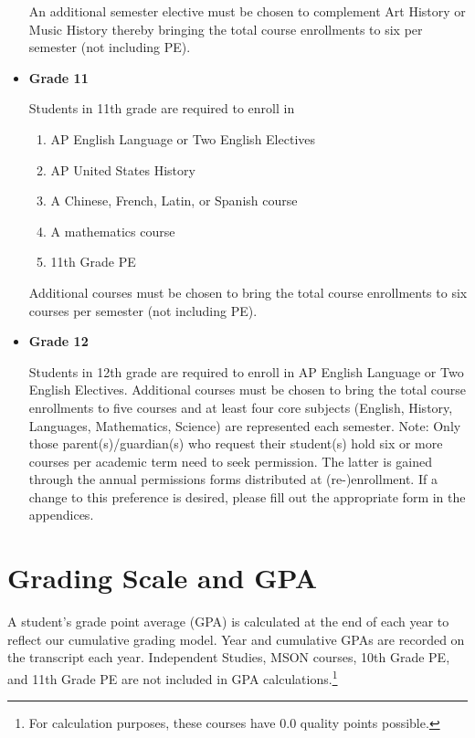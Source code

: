 \begin{itemize}
  An additional semester elective must be chosen to complement Art History or Music History thereby bringing the total course enrollments to six per semester (not including PE).
  
  \item[] \textbf{Grade 11}
  
  Students in 11th grade are required to enroll in 
\begin{enumerate}\itemsep=0mm
    \item AP English Language or Two English Electives
    \item AP United States History
    \item A Chinese, French, Latin, or Spanish course 
    \item A mathematics course
    \item 11th Grade PE
  \end{enumerate}
  
  Additional courses must be chosen to bring the total course enrollments to six courses per semester (not including PE).
  
  \item[] \textbf{Grade 12    }
  
  Students in 12th grade are required to enroll in AP English Language or Two English Electives.  Additional courses must be chosen to bring the total course enrollments to five courses and at least four core subjects (English, History, Languages, Mathematics, Science) are represented each semester.  Note:  Only those parent(s)/guardian(s) who request their student(s)  hold six or more courses per academic term need to seek permission.  The latter is gained through the annual permissions forms distributed at (re-)enrollment.  If a change to this preference is desired, please fill out the appropriate form in the appendices.

\end{itemize}

\section{Grading Scale and GPA}

A student's grade point average (GPA) is calculated at the end of each year to reflect our cumulative grading model. Year and cumulative GPAs are recorded on the transcript each year.  Independent Studies, MSON courses, 10th Grade PE, and 11th Grade PE are not included in GPA calculations.\footnote{For calculation purposes, these courses have $0.0$ quality points possible.}

